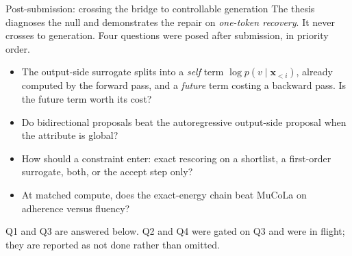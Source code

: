 \documentclass{beamer}
\begin{document}

\begin{frame}[noframenumbering]{Post-submission: crossing the bridge to controllable generation}
  \small
  The thesis diagnoses the null and demonstrates the repair on \emph{one-token recovery}.
  It never crosses to generation. Four questions were posed after submission, in priority
  order.
  \begin{itemize}\small
    \item {} The output-side surrogate splits into a \emph{self} term
      $\log p(v\mid\bm{x}_{<i})$, already computed by the forward pass, and a \emph{future}
      term costing a backward pass. Is the future term worth its cost?
    \item {} Do bidirectional proposals beat the autoregressive
      output-side proposal when the attribute is global?
    \item {} How should a constraint enter: exact rescoring on a
      shortlist, a first-order surrogate, both, or the accept step only?
    \item {} At matched compute, does the exact-energy chain beat
      MuCoLa on adherence versus fluency?
  \end{itemize}
  \vspace{0.3em}
  {\footnotesize Q1 and Q3 are answered below. Q2 and Q4 were gated on Q3 and were in
  flight; they are reported as not done rather than omitted.}
\end{frame}
\end{document}
